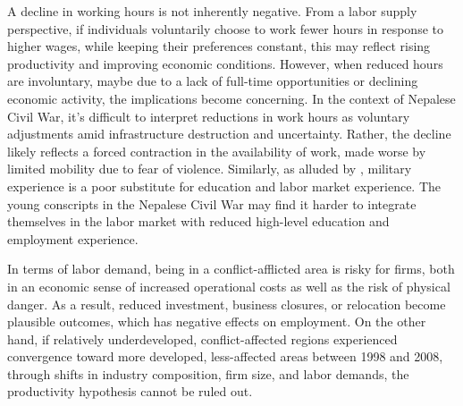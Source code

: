\documentclass[12pt,a4paper]{article}
\begin{document}
A decline in working hours is not inherently negative. From a labor supply perspective, if individuals voluntarily choose to work fewer hours in response to higher wages, while keeping their preferences constant, this may reflect rising productivity and improving economic conditions. However, when reduced hours are involuntary, maybe due to a lack of full-time opportunities or declining economic activity, the implications become concerning. In the context of Nepalese Civil War, it's difficult to interpret reductions in work hours as voluntary adjustments amid infrastructure destruction and uncertainty. Rather, the decline likely reflects a forced contraction in the availability of work, made worse by limited mobility due to fear of violence. Similarly, as alluded by \textcite{blattman2010civil}, military experience is a poor substitute for education and labor market experience. The young conscripts in the Nepalese Civil War may find it harder to integrate themselves in the labor market with reduced high-level education and employment experience.

In terms of labor demand, being in a conflict-afflicted area is risky for firms, both in an economic sense of increased operational costs as well as the risk of physical danger. As a result, reduced investment, business closures, or relocation become plausible outcomes, which has negative effects on employment. On the other hand, if relatively underdeveloped, conflict-affected regions experienced convergence toward more developed, less-affected areas between 1998 and 2008, through shifts in industry composition, firm size, and labor demands, the productivity hypothesis cannot be ruled out.

\printbibliography
	
\end{document}
